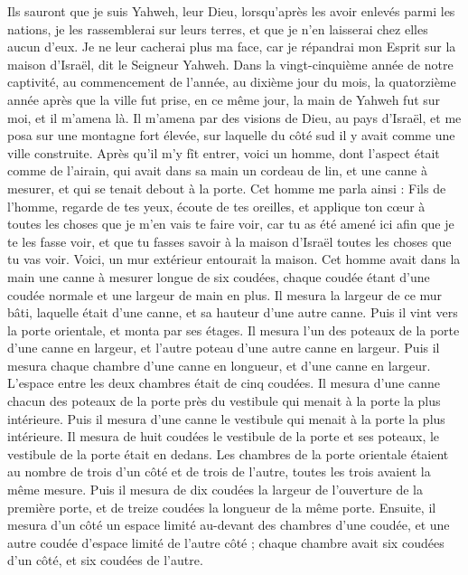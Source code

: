 \begin{multicols}{2}
Ils sauront que je suis Yahweh, leur Dieu, lorsqu'après les avoir enlevés parmi les nations, je les rassemblerai sur leurs terres, et que je n'en laisserai chez elles aucun d’eux.
Je ne leur cacherai plus ma face, car je répandrai mon Esprit sur la maison d'Israël, dit le Seigneur Yahweh.
\VerseOne{}Dans la vingt-cinquième année de notre captivité, au commencement de l'année, au dixième jour du mois, la quatorzième année après que la ville fut prise, en ce même jour, la main de Yahweh fut sur moi, et il m'amena là.
Il m'amena par des visions de Dieu, au pays d'Israël, et me posa sur une montagne fort élevée, sur laquelle du côté sud il y avait comme une ville construite.
Après qu'il m'y fît entrer, voici un homme, dont l’aspect était comme de l'airain, qui avait dans sa main un cordeau de lin, et une canne à mesurer, et qui se tenait debout à la porte.
Cet homme me parla ainsi : Fils de l’homme, regarde de tes yeux, écoute de tes oreilles, et applique ton cœur à toutes les choses que je m'en vais te faire voir, car tu as été amené ici afin que je te les fasse voir, et que tu fasses savoir à la maison d'Israël toutes les choses que tu vas voir.
Voici, un mur extérieur entourait la maison. Cet homme avait dans la main une canne à mesurer longue de six coudées, chaque coudée étant d'une coudée normale et une largeur de main en plus. Il mesura la largeur de ce mur bâti, laquelle était d'une canne, et sa hauteur d'une autre canne.
Puis il vint vers la porte orientale, et monta par ses étages. Il mesura l'un des poteaux de la porte d'une canne en largeur, et l'autre poteau d'une autre canne en largeur.
Puis il mesura chaque chambre d'une canne en longueur, et d'une canne en largeur. L’espace entre les deux chambres était de cinq coudées. Il mesura d'une canne chacun des poteaux de la porte près du vestibule qui menait à la porte la plus intérieure.
Puis il mesura d'une canne le vestibule qui menait à la porte la plus intérieure.
Il mesura de huit coudées le vestibule de la porte et ses poteaux, le vestibule de la porte était en dedans.
Les chambres de la porte orientale étaient au nombre de trois d’un côté et de trois de l’autre, toutes les trois avaient la même mesure.
Puis il mesura de dix coudées la largeur de l'ouverture de la première porte, et de treize coudées la longueur de la même porte.
Ensuite, il mesura d'un côté un espace limité au-devant des chambres d'une coudée, et une autre coudée d'espace limité de l'autre côté ; chaque chambre avait six coudées d’un côté, et six coudées de l’autre.

\end{multicols}
